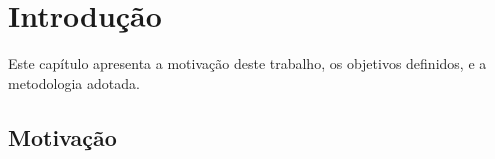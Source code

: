\chapter[Introdução]{Introdução}
\par Este capítulo apresenta a motivação deste trabalho, os objetivos definidos, e a metodologia adotada.

\section{Motivação}

